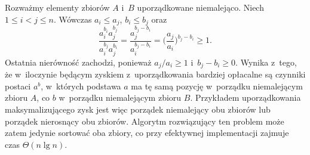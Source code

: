 \exercise %
Rozważmy elementy zbiorów $A$ i~$B$ uporządkowane niemalejąco.
Niech $1\le i<j\le n$.
Wówczas $a_i\le a_j$, $b_i\le b_j$ oraz
\[
	\frac{a_i^{b_i}a_j^{b_j}}{a_i^{b_j}a_j^{b_i}} = \frac{a_j^{b_j-b_i}}{a_i^{b_j-b_i}} = \biggl(\frac{a_j}{a_i}\biggr)^{b_j-b_i} \ge 1.
\]
Ostatnia nierówność zachodzi, ponieważ $a_j/a_i\ge1$ i~$b_j-b_i\ge0$.
Wynika z~tego, że w~iloczynie będącym zyskiem z~uporządkowania bardziej opłacalne są czynniki postaci $a^b$, w~których podstawa $a$ ma tę samą pozycję w~porządku niemalejącym zbioru $A$, co $b$ w~porządku niemalejącym zbioru $B$.
Przykładem uporządkowania maksymalizującego zysk jest więc porządek niemalejący obu zbiorów lub porządek nierosnący obu zbiorów.
Algorytm rozwiązujący ten problem może zatem jedynie sortować oba zbiory, co przy efektywnej implementacji zajmuje czas $\Theta(n\lg n)$.

